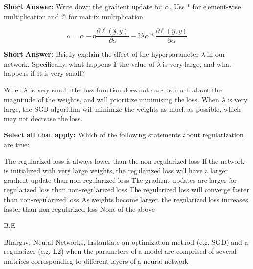 \begin{parts}
\begin{subparts}
    \subpart[1] \textbf{Short Answer:} Write down the gradient update for $\alpha$. Use $*$ for element-wise multiplication and $@$ for matrix multiplication
   \begin{tcolorbox}[fit,height=6cm, width=15cm, blank, borderline={1pt}{-2pt}]
    \end{tcolorbox}
    \begin{soln}
        $$\alpha = \alpha - \eta \frac{\partial \ell(\hat{y}, y)}{\partial \alpha} - 2\lambda \alpha * \frac{\partial \ell(\hat{y}, y)}{\partial \alpha} $$
    \end{soln}
    \subpart[1] \textbf{Short Answer:} Briefly explain the effect of the hyperparameter $\lambda$ in our network. Specifically, what happens if the value of $\lambda$ is very large, and what happens if it is very small?
    \fillwithlines{8em}
    \begin{soln}
        When $\lambda$ is very small, the loss function does not care as much about the magnitude of the weights, and will prioritize minimizing the loss. When $\lambda$ is very large, the SGD algorithm will minimize the weights as much as possible, which may not decrease the loss.
    \end{soln}
    \subpart[2] \textbf{Select all that apply:} Which of the following statements about regularization are true:
    {%
    \checkboxchar{$\Box$} \checkedchar{$\blacksquare$} %
    \begin{checkboxes}
     \choice The regularized loss is always lower than the non-regularized loss
     \choice If the network is initialized with very large weights, the regularized loss will have a larger gradient update than non-regularized loss
     \choice The gradient updates are larger for regularized loss than non-regularized loss
     \choice The regularized loss will converge faster than non-regularized loss
     \choice As weights become larger, the regularized loss increases faster than non-regularized loss
     \choice None of the above
    \end{checkboxes}
    }
    \begin{soln}
    B,E
    \end{soln}
    \begin{qauthor}
        Bhargav, Neural Networks, Instantiate an optimization method (e.g. SGD) and a regularizer (e.g. L2) when the parameters of a model are comprised of several matrices corresponding to different layers of a neural network
    \end{qauthor}
\end{subparts}




\end{parts}

